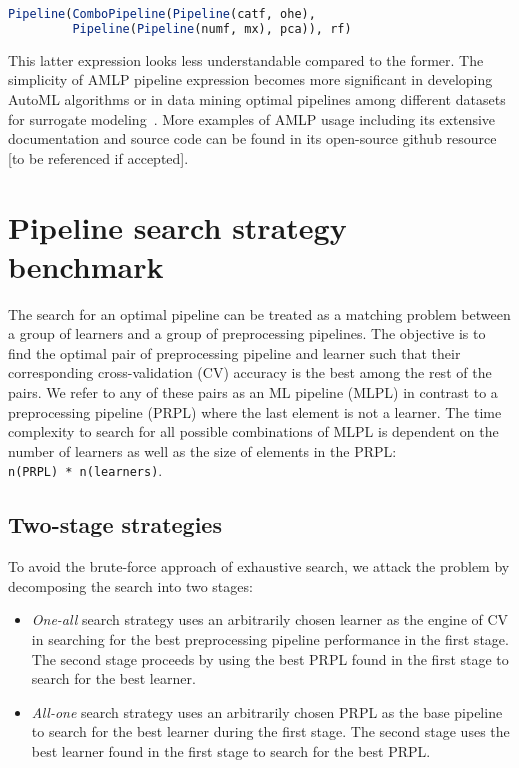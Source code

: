 \documentclass{juliacon}
\begin{document}
\begin{lstlisting}[language = Julia,numbers=none]
Pipeline(ComboPipeline(Pipeline(catf, ohe),
         Pipeline(Pipeline(numf, mx), pca)), rf)
\end{lstlisting}

\vskip 6pt

This latter expression looks less understandable compared to the former. The
simplicity of AMLP pipeline expression becomes more significant in developing
AutoML algorithms or in data mining optimal pipelines among  different datasets
for surrogate modeling~\cite{avatar2020}.  More examples of AMLP usage
including its extensive documentation and source code can be found in its
open-source github resource [to be referenced if accepted].

\section{Pipeline search strategy benchmark}

The search for an optimal pipeline can be treated as a matching problem between a
group of learners and a group of preprocessing pipelines.  The objective is to
find the optimal pair of preprocessing pipeline and learner such that their
corresponding cross-validation (CV) accuracy is the best among the rest of the
pairs.  We refer to any of these pairs as an ML pipeline (MLPL) in contrast to a
preprocessing pipeline (PRPL) where the last element is not a learner.  The
time complexity to search for all possible combinations of MLPL is dependent on
the number of learners as well as the size of elements in the PRPL:
\texttt{n(PRPL)~*~n(learners)}.

\subsection{Two-stage strategies}

To avoid the brute-force approach of exhaustive search, we attack the problem
by decomposing the search into two stages:

\begin{itemize}
  \item \emph{One-all} search strategy uses an arbitrarily
     chosen learner as the    engine of
    CV in searching for the best preprocessing pipeline performance
    in the first stage. The second stage proceeds by
    using the best PRPL found in
    the first stage to search for the best learner.
  \item \emph{All-one} search strategy uses an
    arbitrarily chosen PRPL as the base pipeline
    to search for the best
    learner during the first stage. The second stage
    uses the best learner found in the first
    stage to search for the best PRPL.
\end{itemize}
\end{document}
